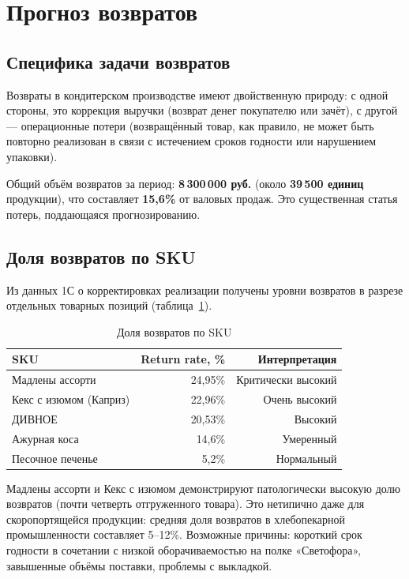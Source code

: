 \section{Прогноз возвратов}

\subsection{Специфика задачи возвратов}

Возвраты в кондитерском производстве имеют двойственную природу: с одной стороны, это коррекция выручки (возврат денег покупателю или зачёт), с другой --- операционные потери (возвращённый товар, как правило, не может быть повторно реализован в связи с истечением сроков годности или нарушением упаковки).

Общий объём возвратов за период: \textbf{8\,300\,000 руб.} (около \textbf{39\,500 единиц} продукции), что составляет \textbf{15,6\%} от валовых продаж. Это существенная статья потерь, поддающаяся прогнозированию.

\subsection{Доля возвратов по SKU}

Из данных 1С о корректировках реализации получены уровни возвратов в разрезе отдельных товарных позиций (таблица~\ref{tab:return_rates}).

\begin{table}[H]
\centering
\caption{Доля возвратов по SKU}
\label{tab:return_rates}
\begin{tabular}{lrr}
\toprule
\textbf{SKU} & \textbf{Return rate, \%} & \textbf{Интерпретация} \\
\midrule
Мадлены ассорти & 24,95\% & Критически высокий \\
Кекс с изюмом (Каприз) & 22,96\% & Очень высокий \\
ДИВНОЕ & 20,53\% & Высокий \\
Ажурная коса & 14,6\% & Умеренный \\
Песочное печенье & 5,2\% & Нормальный \\
\bottomrule
\end{tabular}
\end{table}

Мадлены ассорти и Кекс с изюмом демонстрируют патологически высокую долю возвратов (почти четверть отгруженного товара). Это нетипично даже для скоропортящейся продукции: средняя доля возвратов в хлебопекарной промышленности составляет 5--12\%. Возможные причины: короткий срок годности в сочетании с низкой оборачиваемостью на полке «Светофора», завышенные объёмы поставки, проблемы с выкладкой.

